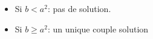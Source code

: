 \begin{itemize}
 \item Si $b<a^2$: pas de solution.
 \item Si $b\geq a^2$: un unique couple solution
\end{itemize}
